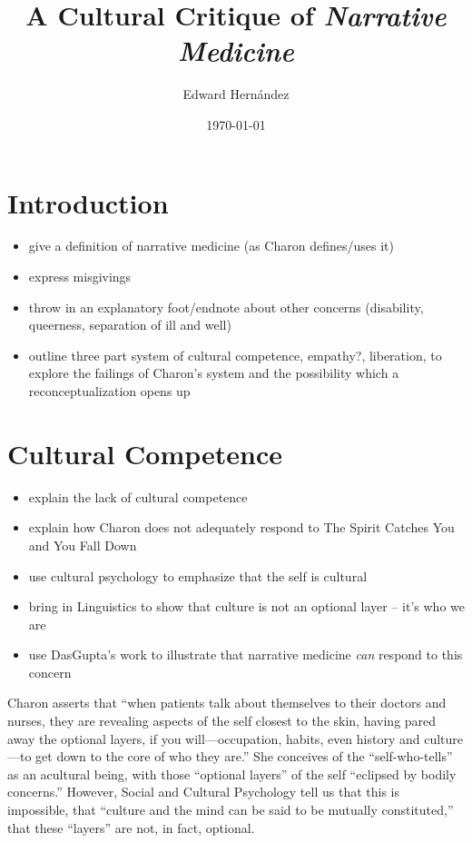 \documentclass[12pt]{article}
\begin{document}
\title{A Cultural Critique of \emph{Narrative Medicine}}
\author{Edward Hern\'{a}ndez}
\date{\today}

\maketitle

\abstract{}

\section{Introduction}

\begin{itemize}
	\item give a definition of narrative medicine (as Charon defines/uses it)
	\item express misgivings
	\item throw in an explanatory foot/endnote about other concerns (disability, queerness, separation of ill and well)
	\item outline three part system of cultural competence, empathy?, liberation, to explore the failings of Charon's system and the possibility which a reconceptualization opens up

\end{itemize}

\section{Cultural Competence}

\begin{itemize}
	\item explain the lack of cultural competence
	\item explain how Charon does not adequately respond to The Spirit Catches You and You Fall Down
	\item use cultural psychology to emphasize that the self is cultural
	\item bring in Linguistics to show that culture is not an optional layer -- it's who we are
	\item use DasGupta's work to illustrate that narrative medicine \emph{can} respond to this concern
\end{itemize}

Charon asserts that ``when patients talk about themselves to their doctors and
nurses, they are revealing aspects of the self closest to the skin, having
pared away the optional layers, if you will—occupation, habits, even history
and culture—to get down to the core of who they
are.''\autocite[p.~78]{Charon06} She conceives of the ``self-who-tells'' as an
acultural being, with those ``optional layers'' of the self ``eclipsed by
bodily concerns.''\autocite[p.~78]{Charon06}
However, Social and Cultural Psychology tell
us that this is impossible, that ``culture and the mind can be said to be
mutually constituted,''\autocite[p.~1423]{Heine10} that these ``layers'' are
not, in fact, optional.
\end{document}
